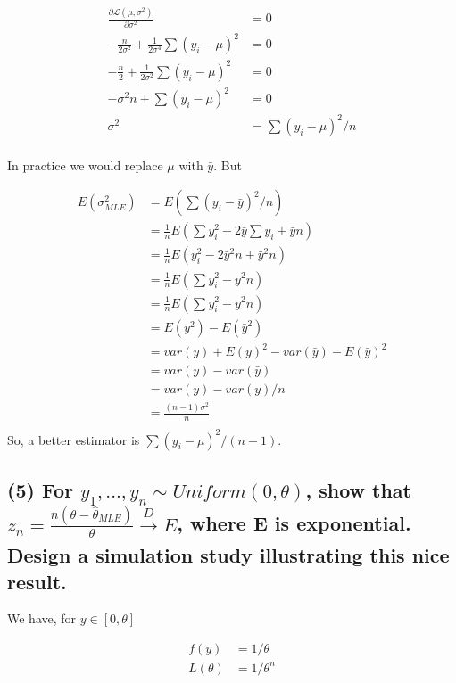 \documentclass[11pt]{article}
\begin{document}
\begin{align*}
    \frac{\partial \mathcal{L}(\mu, \sigma^2)}{\partial \sigma^2} &= 0 \\
    -\frac{n}{2\sigma^2} + \frac{1}{2\sigma^4}\sum (y_i - \mu)^2&= 0 \\
     -\frac{n}{2} + \frac{1}{2\sigma^2}\sum (y_i - \mu)^2&= 0 \\
     -\sigma^2n +\sum (y_i - \mu)^2&= 0 \\
     \sigma^2 &= \sum (y_i - \mu)^2 / n \\
\end{align*}

In practice we would replace $\mu$ with $\bar{y}$. But

\begin{align*}
    E(\sigma^2_{MLE}) &= E\left(\sum (y_i - \bar{y})^2 / n\right)\\
    &= \frac{1}{n} E\left(\sum y_i^2 - 2\bar{y} \sum y_i + \bar{y}n \right)\\
    &= \frac{1}{n} E\left( y_i^2 - 2\bar{y}^2n + \bar{y}^2n \right)\\
     &= \frac{1}{n} E\left( \sum y_i^2 - \bar{y}^2n \right)\\
      &= \frac{1}{n} E\left( \sum y_i^2 - \bar{y}^2n \right)\\
       &=  E( y^2) - E(\bar{y}^2)\\
          &=  var(y) + E(y)^2 - var(\bar{y}) - E(\bar{y})^2 \\
            &=  var(y)  - var(\bar{y}) \\
              &=  var(y)  - var(y)/n \\
               &=  \frac{(n-1)\sigma^2}{n}\\
\end{align*}
So, a better estimator is $\sum (y_i - \mu)^2 / (n-1) $.

\subsection*{(5) For $y_1,...,y_n \sim Uniform(0, 
\theta)$, show that $ z_n = \frac{n(\theta-\hat{\theta}_{MLE})}{\theta} \xrightarrow[]{D} E$, where E is exponential. Design a simulation study illustrating this nice result.}

We have, for $y \in [0, \theta]$

\begin{align*}
    f(y) &= 1/\theta \\ 
    L(\theta) &= 1/ \theta ^n\\
\end{align*}
\end{document}
